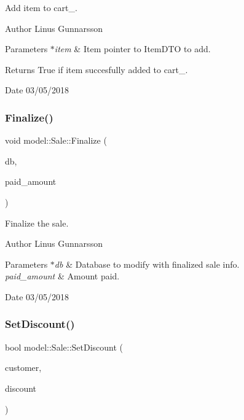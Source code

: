 Add item to cart\+\_\+. \begin{DoxyAuthor}{Author}
Linus Gunnarsson 
\end{DoxyAuthor}

\begin{DoxyParams}{Parameters}
{\em $\ast$item} & Item pointer to Item\+D\+TO to add. \\
\hline
\end{DoxyParams}
\begin{DoxyReturn}{Returns}
True if item succesfully added to cart\+\_\+. 
\end{DoxyReturn}
\begin{DoxyDate}{Date}
03/05/2018 
\end{DoxyDate}
\mbox{\label{classmodel_1_1Sale_a092d73ac058910164043c5d2a4c27bf6}} 
\subsubsection{\texorpdfstring{Finalize()}{Finalize()}}
{\footnotesize\ttfamily void model\+::\+Sale\+::\+Finalize (\begin{DoxyParamCaption}\item[{\mbox{\hyperlink{classdb_1_1Database}{db\+::\+Database}} $\ast$}]{db,  }\item[{double}]{paid\+\_\+amount }\end{DoxyParamCaption})}

Finalize the sale. \begin{DoxyAuthor}{Author}
Linus Gunnarsson 
\end{DoxyAuthor}

\begin{DoxyParams}{Parameters}
{\em $\ast$db} & Database to modify with finalized sale info. \\
\hline
{\em paid\+\_\+amount} & Amount paid. \\
\hline
\end{DoxyParams}
\begin{DoxyDate}{Date}
03/05/2018 
\end{DoxyDate}
\mbox{\label{classmodel_1_1Sale_adf3d95e3f8ec65f7c7c707e982dd3169}} 
\subsubsection{\texorpdfstring{Set\+Discount()}{SetDiscount()}}
{\footnotesize\ttfamily bool model\+::\+Sale\+::\+Set\+Discount (\begin{DoxyParamCaption}\item[{std\+::string}]{customer,  }\item[{char}]{discount }\end{DoxyParamCaption})}

